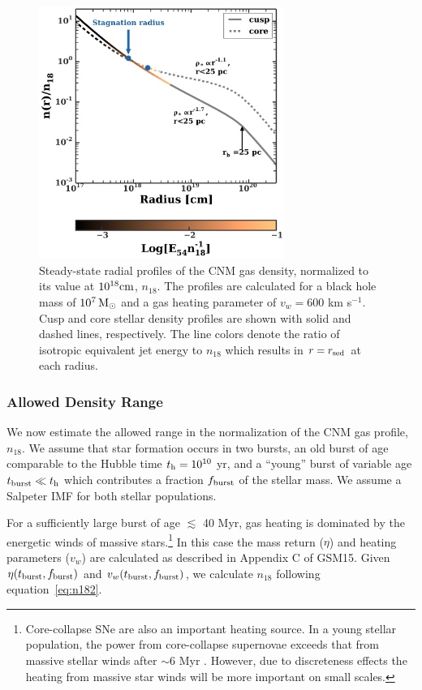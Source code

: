 \documentclass[usenatbib,fleqn]{mnras}
\newcommand{\Msun}{{\rm M_\odot}}
\begin{document}
\begin{figure}
\includegraphics[width=8cm]{sedov_radius.pdf}
\caption{\label{fig:profiles} Steady-state radial profiles of the CNM
  gas density, normalized to its value at $10^{18} {\rm cm}$,
  $n_{18}$. The profiles are calculated for a black hole mass of
  $10^{7} \,\Msun$ and a gas heating parameter of $v_w=600$ km
  s$^{-1}$.  Cusp and core stellar density profiles are shown with
  solid and dashed lines, respectively.  The line colors denote the
  ratio of isotropic equivalent jet energy to $n_{18}$ which results
  in $r = r_{\rm sed}$ at each radius.}
\end{figure}

\subsubsection{Allowed Density Range}
\label{sec:densAllowed}
We now estimate the allowed range in the normalization of the CNM gas
profile, $n_{18}$.  We assume that star formation occurs in two
bursts, an old burst of age comparable to the Hubble time $t_{\rm h} =
10^{10}$ yr, and a ``young'' burst of variable age $t_{\rm burst} \ll
t_{\rm h}$ which contributes a fraction $f_{\rm burst}$ of the stellar
mass. We assume a Salpeter IMF for both stellar populations.

For a sufficiently large burst of age $\lesssim$ 40 Myr, gas heating
is dominated by the energetic winds of massive
stars.\footnote{Core-collapse SNe are also an important heating
  source.  In a young stellar population, the power from core-collapse
  supernovae exceeds that from massive stellar winds after $\sim$6 Myr
  \citep{Voss+2009}. However, due to discreteness effects the heating
  from massive star winds will be more important on small scales.}  In
this case the mass return ($\eta$) and heating parameters ($v_w$) are
calculated as described in Appendix C of GSM15. Given $\eta(t_{\rm
  burst},f_{\rm burst})$ and $v_w(t_{\rm burst},f_{\rm burst})$, we
calculate $n_{18}$ following equation~\eqref{eq:n182}.
\end{document}
